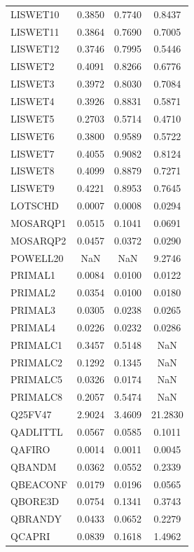 \begin{longtable}{lccc}
LISWET10 &   0.3850 &   0.7740 &   0.8437 \\
LISWET11 &   0.3864 &   0.7690 &   0.7005 \\
LISWET12 &   0.3746 &   0.7995 &   0.5446 \\
LISWET2  &   0.4091 &   0.8266 &   0.6776 \\
LISWET3  &   0.3972 &   0.8030 &   0.7084 \\
LISWET4  &   0.3926 &   0.8831 &   0.5871 \\
LISWET5  &   0.2703 &   0.5714 &   0.4710 \\
LISWET6  &   0.3800 &   0.9589 &   0.5722 \\
LISWET7  &   0.4055 &   0.9082 &   0.8124 \\
LISWET8  &   0.4099 &   0.8879 &   0.7271 \\
LISWET9  &   0.4221 &   0.8953 &   0.7645 \\
LOTSCHD  &   0.0007 &   0.0008 &   0.0294 \\
MOSARQP1 &   0.0515 &   0.1041 &   0.0691 \\
MOSARQP2 &   0.0457 &   0.0372 &   0.0290 \\
POWELL20 &      NaN &      NaN &   9.2746 \\
PRIMAL1  &   0.0084 &   0.0100 &   0.0122 \\
PRIMAL2  &   0.0354 &   0.0100 &   0.0180 \\
PRIMAL3  &   0.0305 &   0.0238 &   0.0265 \\
PRIMAL4  &   0.0226 &   0.0232 &   0.0286 \\
PRIMALC1 &   0.3457 &   0.5148 &      NaN \\
PRIMALC2 &   0.1292 &   0.1345 &      NaN \\
PRIMALC5 &   0.0326 &   0.0174 &      NaN \\
PRIMALC8 &   0.2057 &   0.5474 &      NaN \\
Q25FV47  &   2.9024 &   3.4609 &  21.2830 \\
QADLITTL &   0.0567 &   0.0585 &   0.1011 \\
QAFIRO   &   0.0014 &   0.0011 &   0.0045 \\
QBANDM   &   0.0362 &   0.0552 &   0.2339 \\
QBEACONF &   0.0179 &   0.0196 &   0.0565 \\
QBORE3D  &   0.0754 &   0.1341 &   0.3743 \\
QBRANDY  &   0.0433 &   0.0652 &   0.2279 \\
QCAPRI   &   0.0839 &   0.1618 &   1.4962 \\

\end{longtable}
